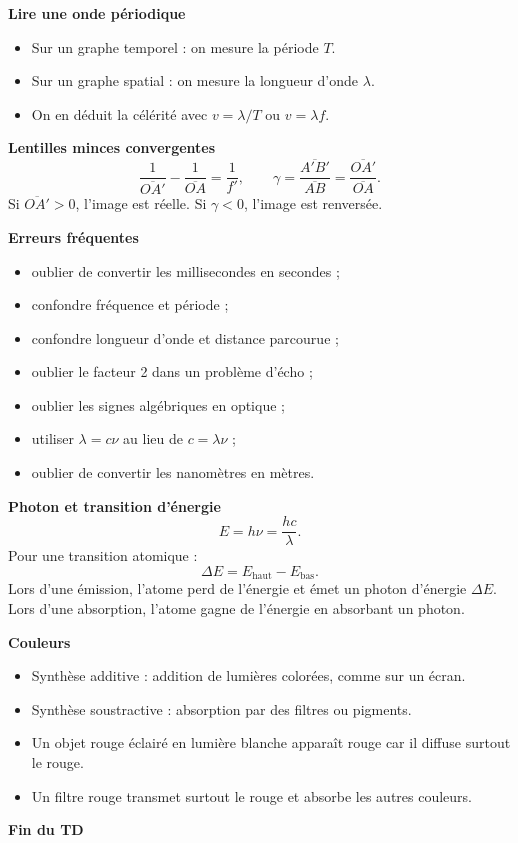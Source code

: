 \documentclass[11pt,a4paper]{article}
\begin{document}
\begin{methodbox}
\textbf{Lire une onde périodique}
\begin{itemize}
  \item Sur un graphe temporel : on mesure la période $T$.
  \item Sur un graphe spatial : on mesure la longueur d'onde $\lambda$.
  \item On en déduit la célérité avec $v=\lambda/T$ ou $v=\lambda f$.
\end{itemize}
\end{methodbox}

\begin{retenirbox}
\textbf{Lentilles minces convergentes}
\[
\frac{1}{\overline{OA'}}-\frac{1}{\overline{OA}}=\frac{1}{f'},
\qquad
\gamma=\frac{\overline{A'B'}}{\overline{AB}}
=\frac{\overline{OA'}}{\overline{OA}}.
\]
Si $\overline{OA'}>0$, l'image est réelle. Si $\gamma<0$, l'image est renversée.
\end{retenirbox}

\begin{erreurbox}
\textbf{Erreurs fréquentes}
\begin{itemize}
  \item oublier de convertir les millisecondes en secondes ;
  \item confondre fréquence et période ;
  \item confondre longueur d'onde et distance parcourue ;
  \item oublier le facteur 2 dans un problème d'écho ;
  \item oublier les signes algébriques en optique ;
  \item utiliser $\lambda=c\nu$ au lieu de $c=\lambda\nu$ ;
  \item oublier de convertir les nanomètres en mètres.
\end{itemize}
\end{erreurbox}

\begin{methodbox}
\textbf{Photon et transition d'énergie}
\[
E=h\nu=\frac{hc}{\lambda}.
\]
Pour une transition atomique :
\[
\Delta E=E_{\text{haut}}-E_{\text{bas}}.
\]
Lors d'une émission, l'atome perd de l'énergie et émet un photon d'énergie $\Delta E$.
Lors d'une absorption, l'atome gagne de l'énergie en absorbant un photon.
\end{methodbox}

\begin{retenirbox}
\textbf{Couleurs}
\begin{itemize}
  \item Synthèse additive : addition de lumières colorées, comme sur un écran.
  \item Synthèse soustractive : absorption par des filtres ou pigments.
  \item Un objet rouge éclairé en lumière blanche apparaît rouge car il diffuse surtout le rouge.
  \item Un filtre rouge transmet surtout le rouge et absorbe les autres couleurs.
\end{itemize}
\end{retenirbox}

\begin{center}
\Large\bfseries Fin du TD
\end{center}
\end{document}
